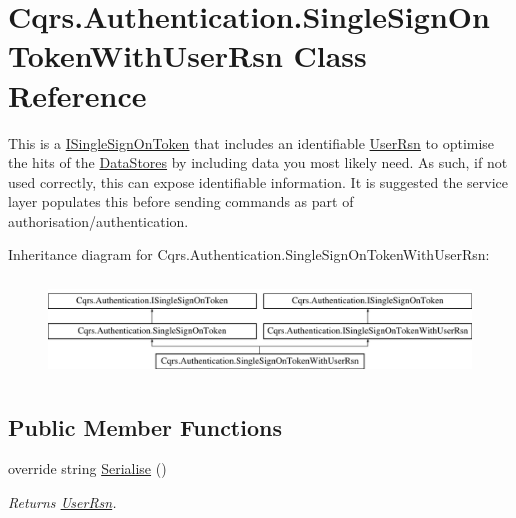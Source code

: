 \hypertarget{classCqrs_1_1Authentication_1_1SingleSignOnTokenWithUserRsn}{}\section{Cqrs.\+Authentication.\+Single\+Sign\+On\+Token\+With\+User\+Rsn Class Reference}
\label{classCqrs_1_1Authentication_1_1SingleSignOnTokenWithUserRsn}


This is a \hyperlink{interfaceCqrs_1_1Authentication_1_1ISingleSignOnToken}{I\+Single\+Sign\+On\+Token} that includes an identifiable \hyperlink{classCqrs_1_1Authentication_1_1SingleSignOnTokenWithUserRsn_a47d20dd286cf61cc23028e75cddcca79_a47d20dd286cf61cc23028e75cddcca79}{User\+Rsn} to optimise the hits of the \hyperlink{}{Data\+Stores} by including data you most likely need. As such, if not used correctly, this can expose identifiable information. It is suggested the service layer populates this before sending commands as part of authorisation/authentication.  


Inheritance diagram for Cqrs.\+Authentication.\+Single\+Sign\+On\+Token\+With\+User\+Rsn\+:\begin{figure}[H]
\begin{center}
\leavevmode
\includegraphics[height=2.633229cm]{classCqrs_1_1Authentication_1_1SingleSignOnTokenWithUserRsn}
\end{center}
\end{figure}
\subsection*{Public Member Functions}
\begin{DoxyCompactItemize}
\item 
override string \hyperlink{classCqrs_1_1Authentication_1_1SingleSignOnTokenWithUserRsn_a8103820e6352c10b3990fb027dd9b5ae_a8103820e6352c10b3990fb027dd9b5ae}{Serialise} ()
\begin{DoxyCompactList}\small\item\em Returns \hyperlink{classCqrs_1_1Authentication_1_1SingleSignOnTokenWithUserRsn_a47d20dd286cf61cc23028e75cddcca79_a47d20dd286cf61cc23028e75cddcca79}{User\+Rsn}. \end{DoxyCompactList}\end{DoxyCompactItemize}
